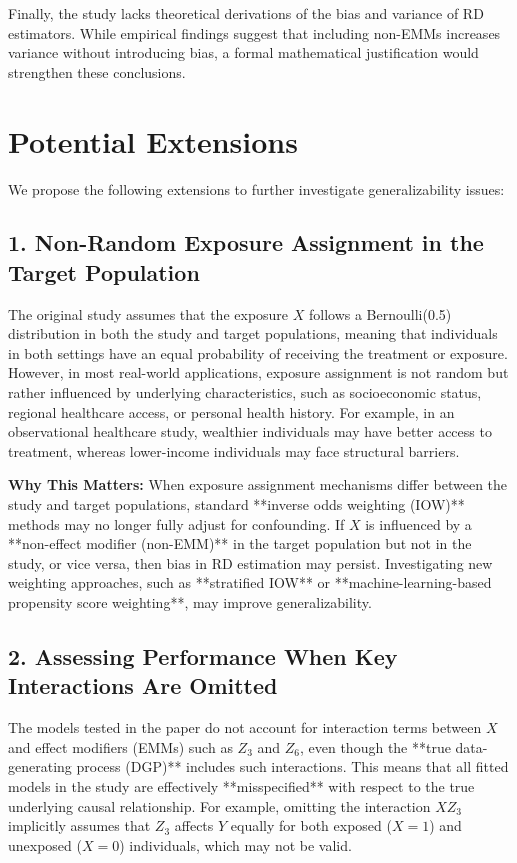 \documentclass[12pt, oneside]{amsart}
\theoremstyle{definition}
\theoremstyle{remark}
\numberwithin{equation}{section}
\begin{document}
Finally, the study lacks theoretical derivations of the bias and variance of RD estimators. While empirical findings suggest that including non-EMMs increases variance without introducing bias, a formal mathematical justification would strengthen these conclusions.

\section{Potential Extensions}
We propose the following extensions to further investigate generalizability issues:

\subsection{1. Non-Random Exposure Assignment in the Target Population}

The original study assumes that the exposure \( X \) follows a Bernoulli(0.5) distribution in both the study and target populations, meaning that individuals in both settings have an equal probability of receiving the treatment or exposure. However, in most real-world applications, exposure assignment is not random but rather influenced by underlying characteristics, such as socioeconomic status, regional healthcare access, or personal health history. For example, in an observational healthcare study, wealthier individuals may have better access to treatment, whereas lower-income individuals may face structural barriers. 

\textbf{Why This Matters:} When exposure assignment mechanisms differ between the study and target populations, standard **inverse odds weighting (IOW)** methods may no longer fully adjust for confounding. If \( X \) is influenced by a **non-effect modifier (non-EMM)** in the target population but not in the study, or vice versa, then bias in RD estimation may persist. Investigating new weighting approaches, such as **stratified IOW** or **machine-learning-based propensity score weighting**, may improve generalizability.

\subsection{2. Assessing Performance When Key Interactions Are Omitted}

The models tested in the paper do not account for interaction terms between \( X \) and effect modifiers (EMMs) such as \( Z_3 \) and \( Z_6 \), even though the **true data-generating process (DGP)** includes such interactions. This means that all fitted models in the study are effectively **misspecified** with respect to the true underlying causal relationship. For example, omitting the interaction \( XZ_3 \) implicitly assumes that \( Z_3 \) affects \( Y \) equally for both exposed (\( X=1 \)) and unexposed (\( X=0 \)) individuals, which may not be valid.
\end{document}
